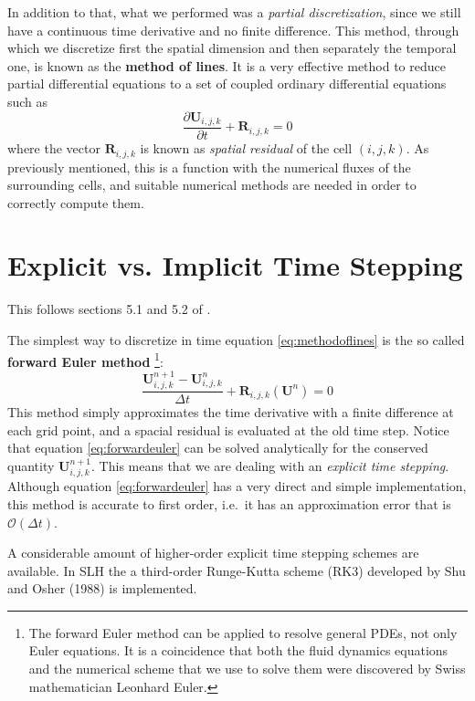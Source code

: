 In addition to that, what we performed was a \textit{partial discretization}, since we still have a continuous time derivative and no finite difference. This method, through which we discretize first the spatial dimension and then separately the temporal one, is known as the \textbf{method of lines}. It is a very effective method to reduce partial differential equations to a set of coupled ordinary differential equations such as
\begin{equation}\label{eq:methodoflines}
	\frac{\partial \mathbf{U}_{i, j, k}}{\partial t} + \mathbf{R}_{i, j, k}=0
\end{equation}
where the vector $\mathbf{R}_{i, j, k}$ is known as \textit{spatial residual} of the cell $(i, j, k)$. As previously mentioned, this is a function with the numerical fluxes of the surrounding cells, and suitable numerical methods are needed in order to correctly compute them.
\section{Explicit vs. Implicit Time Stepping}
This follows sections 5.1 and 5.2 of \citet{miczek}.

The simplest way to discretize in time equation \ref{eq:methodoflines} is the so called \textbf{forward Euler method} \footnote{The forward Euler method can be applied to resolve general PDEs, not only Euler equations. It is a coincidence that both the fluid dynamics equations and the numerical scheme that we use to solve them were discovered by Swiss mathematician Leonhard Euler.}:
\begin{equation}\label{eq:forwardeuler}
	\frac{\mathbf{U}^{n+1}_{i, j, k} - \mathbf{U}^{n}_{i, j, k}}{\Delta t} + \mathbf{R}_{i, j, k}(\mathbf{U}^n)=0
\end{equation}
This method simply approximates the time derivative with a finite difference at each grid point, and a spacial residual is evaluated at the old time step. Notice that equation \ref{eq:forwardeuler} can be solved analytically for the conserved quantity $\mathbf{U}^{n+1}_{i, j, k}$. This means that we are dealing with an \textit{explicit time stepping}. Although equation \ref{eq:forwardeuler} has a very direct and simple implementation, this method is accurate to first order, i.e.\ it has an approximation error that is $\mathcal{O}(\Delta t)$.

A considerable amount of higher-order explicit time stepping schemes are available. In SLH the a third-order Runge-Kutta scheme (RK3) developed by Shu and Osher (1988) is implemented. 

